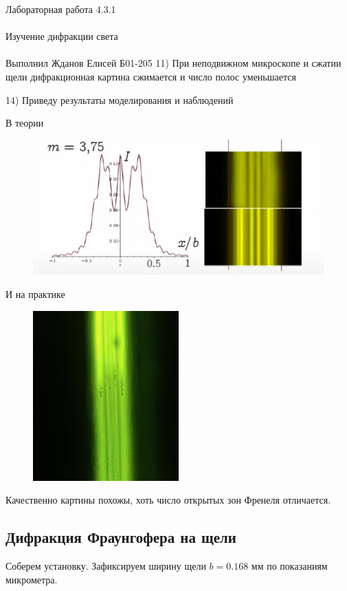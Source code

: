 \documentclass{astroedu-lab}
\begin{document}
\begin{problem}{\huge Лабораторная работа 4.3.1\\\\Изучение дифракции света\\\\Выполнил Жданов Елисей Б01-205}
11) При неподвижном микроскопе и сжатии щели дифракционная картина сжимается и число полос уменьшается

14) Приведу результаты моделирования и наблюдений

В теории

\begin{figure}[!h]
	\centering
	\includegraphics[width=1\textwidth]{th_fren.png}
	\label{fig:boiler}
\end{figure}

И на практике

\begin{figure}[!h]
	\centering
	\includegraphics[width=0.5\textwidth]{pr_fren.jpg}
	\label{fig:boiler}
\end{figure}

Качественно картины похожы, хоть число открытых зон Френеля отличается.

\subsection{Дифракция Фраунгофера на щели}

Соберем установку. Зафиксируем ширину щели $b = 0.168$ мм по показаниям микрометра.


\end{problem}
\end{document}

